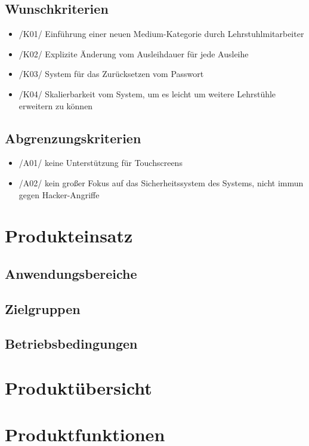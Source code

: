 \documentclass[12pt, a4paper]{article}
\begin{document}
\subsection{Wunschkriterien}
\begin{itemize}
	\item /K01/ Einführung einer neuen Medium-Kategorie durch Lehrstuhlmitarbeiter
	\item /K02/ Explizite Änderung vom Ausleihdauer für jede Ausleihe 
	\item /K03/ System für das Zurücksetzen vom Passwort
	\item /K04/ Skalierbarkeit vom System, um es leicht um weitere Lehrstühle erweitern zu können
\end{itemize}
\subsection{Abgrenzungskriterien}
\begin{itemize}
	\item /A01/ keine Unterstützung für Touchscreens
	\item /A02/ kein großer Fokus auf das Sicherheitssystem des Systems, nicht immun gegen Hacker-Angriffe 
\end{itemize}
\pagebreak

\section{Produkteinsatz}
\subsection{Anwendungsbereiche}
\subsection{Zielgruppen}
\subsection{Betriebsbedingungen}
\pagebreak

\section{Produktübersicht}
\pagebreak

\section{Produktfunktionen}
\pagebreak
\end{document}

